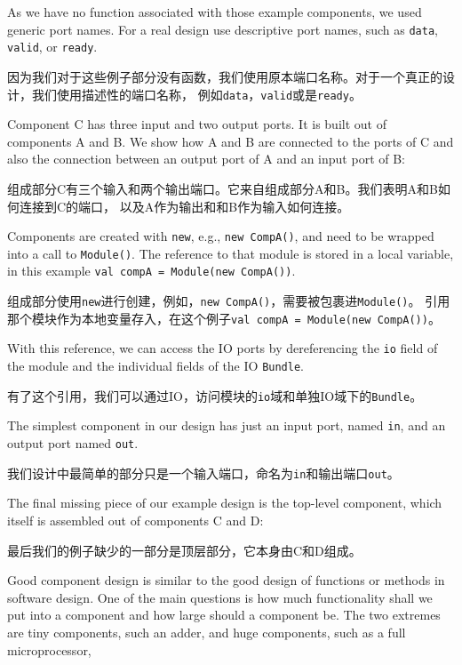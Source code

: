 \documentclass[%
    10pt,
    headinclude, footexclude,
    openright, %
    notitlepage,
    cleardoubleempty,
    headsepline,
    pointlessnumbers,
    bibtotoc, idxtotoc,
    ]{scrbook}
\newcommand{\code}[1]{{\small{\texttt{#1}}}}
\begin{document}
As we have no function associated with those example components,
we used generic port names. For a real design use descriptive
port names, such as \code{data}, \code{valid}, or \code{ready}.

因为我们对于这些例子部分没有函数，我们使用原本端口名称。对于一个真正的设计，我们使用描述性的端口名称，
例如\code{data}，\code{valid}或是\code{ready}。

Component C has three input and two output ports. It is built out of
components A and B. We show how A and B are connected to the ports
of C and also the connection between an output port of A and an
input port of B:

组成部分C有三个输入和两个输出端口。它来自组成部分A和B。我们表明A和B如何连接到C的端口，
以及A作为输出和和B作为输入如何连接。


Components are created with \code{new}, e.g., \code{new CompA()}, and need to be wrapped
into a call to \code{Module()}. The reference to that module is stored in a local variable,
in this example \code{val compA = Module(new CompA())}.

组成部分使用\code{new}进行创建，例如，\code{new CompA()}，需要被包裹进\code{Module()}。
引用那个模块作为本地变量存入，在这个例子\code{val compA = Module(new CompA())}。

With this reference, we can access the IO ports by dereferencing the \code{io} field of the module
and the individual fields of the IO \code{Bundle}.

有了这个引用，我们可以通过IO，访问模块的\code{io}域和单独IO域下的\code{Bundle}。

The simplest component in our design has just an input port, named \code{in}, and
an output port named \code{out}.

我们设计中最简单的部分只是一个输入端口，命名为\code{in}和输出端口\code{out}。


The final missing piece of our example design is the top-level component, which itself
is assembled out of components C and D:

最后我们的例子缺少的一部分是顶层部分，它本身由C和D组成。


Good component design is similar to the good design of functions or methods in
software design. One of the main questions is how much functionality shall we put into
a component and how large should a component be. The two extremes are tiny
components, such an adder, and huge components, such as a full microprocessor,
\end{document}
